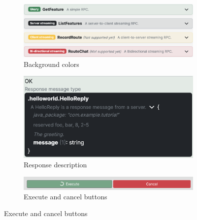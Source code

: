 \begin{figure}[!htb]
    \centering
    \captionsetup{justification=centering}

    \begin{subfigure}{.5\textwidth}
        \centering
        \includegraphics[width=.95\linewidth]{images/testing/screenshots/testing-background-colors}
        \caption{Background colors}
        \label{fig:testing-changes-background-colors}
    \end{subfigure}%
    \begin{subfigure}{.5\textwidth}
        \centering
        \includegraphics[width=.95\linewidth]{images/testing/screenshots/testing-response-description}
        \caption{Response description}
        \label{fig:testing-changes-response}
    \end{subfigure}%

    \vspace{15mm}%

    \begin{subfigure}{.85\textwidth}
        \centering
        \includegraphics[width=.95\linewidth]{images/testing/screenshots/testing-cancel}
        \caption{Execute and cancel buttons}
        \label{fig:testing-changes-cancel}
    \end{subfigure}%

    \vspace{15mm}%


\end{figure}
